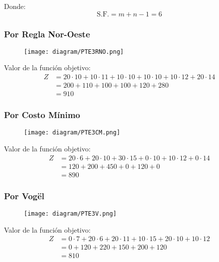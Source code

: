 \documentclass{templateNote}
\begin{document}
Donde:
\begin{equation*}
    \text{S.F.} = m+n-1 = 6
\end{equation*}

\newpage
\subsubsection*{Por Regla Nor-Oeste}
\begin{figure}[H]
    \centering
    \texttt{[image: diagram/PTE3RNO.png]}
\end{figure}
Valor de la función objetivo:
\begin{align*}
    Z &= 20 \cdot 10 + 10 \cdot 11 + 10 \cdot 10 + 10 \cdot 10 + 10 \cdot 12 + 20 \cdot 14 \\
    &= 200 + 110 + 100 + 100 + 120 + 280 \\
    &= 910
\end{align*}

\subsubsection*{Por Costo Mínimo}
\begin{figure}[H]
    \centering
    \texttt{[image: diagram/PTE3CM.png]}
\end{figure}
Valor de la función objetivo:
\begin{align*}
    Z &= 20 \cdot 6 + 20 \cdot 10 + 30 \cdot 15 + 0 \cdot 10 + 10 \cdot 12 + 0 \cdot 14 \\
    &= 120 + 200 + 450 + 0 + 120 + 0 \\
    &= 890
\end{align*}

\subsubsection*{Por Vogël}
\begin{figure}[H]
    \centering
    \texttt{[image: diagram/PTE3V.png]}
\end{figure}
Valor de la función objetivo:
\begin{align*}
    Z &= 0 \cdot 7 + 20 \cdot 6 + 20 \cdot 11 + 10 \cdot 15 + 20 \cdot 10 + 10 \cdot 12 \\
    &= 0 + 120 + 220 + 150 + 200 + 120 \\
    &= 810
\end{align*}

\newpage
\end{document}
